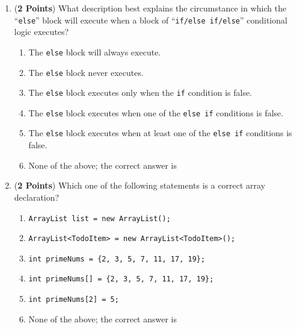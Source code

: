 \documentclass[12pt]{article}
\begin{document}
\begin{enumerate}

  \item ({\bf 2 Points}) What description best explains the circumstance in which the ``{\tt else}''
    block will execute when a block of ``{\tt if/else if/else}'' conditional logic executes?

\begin{enumerate}
  \item The {\tt else} block will always execute.

\medskip
\item The {\tt else} block never executes.

\medskip
\item The {\tt else} block executes only when the {\tt if} condition is false.

\medskip 
\item The {\tt else} block executes when one of the {\tt else if} conditions is false.

\medskip 
\item The {\tt else} block executes when at least one of the {\tt else if} conditions is false.

\medskip
\item None of the above; the correct answer is \underline{\hspace{3in}}
\end{enumerate}

\vspace*{1in}

\item ({\bf 2 Points})
  Which one of the following statements is a correct array declaration?

  \begin{enumerate}
    \item {\tt ArrayList list = new ArrayList();}
      \medskip 
    \item {\tt ArrayList<TodoItem> = new ArrayList<TodoItem>();}
      \medskip
    \item {\tt int primeNums = \{2, 3, 5, 7, 11, 17, 19\};}
      \medskip 
    \item {\tt int primeNums[] = \{2, 3, 5, 7, 11, 17, 19\};}
      \medskip
    \item {\tt int primeNums[2] = 5;}
      \medskip
\item None of the above; the correct answer is \underline{\hspace{3in}}
  \end{enumerate}


\end{enumerate}
\end{document}
